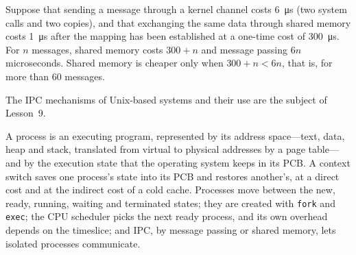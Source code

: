 \documentclass[../main.tex]{subfiles}
\begin{document}
\begin{example}
  Suppose that sending a message through a kernel channel costs
  \SI{6}{\micro\second} (two system calls and two copies), and that
  exchanging the same data through shared memory costs
  \SI{1}{\micro\second} after the mapping has been established at a
  one-time cost of \SI{300}{\micro\second}.  For $n$ messages, shared memory
  costs $300 + n$ and message passing $6n$ microseconds.  Shared memory is
  cheaper only when $300 + n < 6n$, that is, for more than 60
  messages.
\end{example}

The IPC mechanisms of Unix-based systems and their use are the subject of
Lesson~9.


\begin{keypoint}
  A process is an executing program, represented by its address
  space---text, data, heap and stack, translated from virtual to physical
  addresses by a page table---and by the execution state that the operating
  system keeps in its PCB.  A context switch saves one process's state into
  its PCB and restores another's, at a direct cost and at the indirect cost
  of a cold cache.  Processes move between the new, ready, running, waiting
  and terminated states; they are created with \texttt{fork} and
  \texttt{exec}; the CPU scheduler picks the next ready process, and its
  own overhead depends on the timeslice; and IPC, by message passing or
  shared memory, lets isolated processes communicate.
\end{keypoint}
\end{document}
